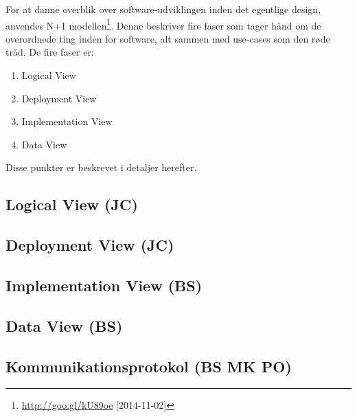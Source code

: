 For at danne overblik over software-udviklingen inden det egentlige design, anvendes N+1 modellen\footnote{\url{http://goo.gl/kU89oe} [2014-11-02]}.
Denne beskriver fire faser som tager hånd om de overordnede ting inden for software, alt sammen med use-cases som den røde tråd.
De fire faser er:

\begin{enumerate}
	\item Logical View
	\item Deployment View
	\item Implementation View
	\item Data View
\end{enumerate}

Disse punkter er beskrevet i detaljer herefter.

\subsection{Logical View (JC)}


\clearpage
\subsection{Deployment View (JC)}



\subsection{Implementation View (BS)}


\subsection{Data View (BS)}


%

\subsection{Kommunikationsprotokol (BS MK PO)}
